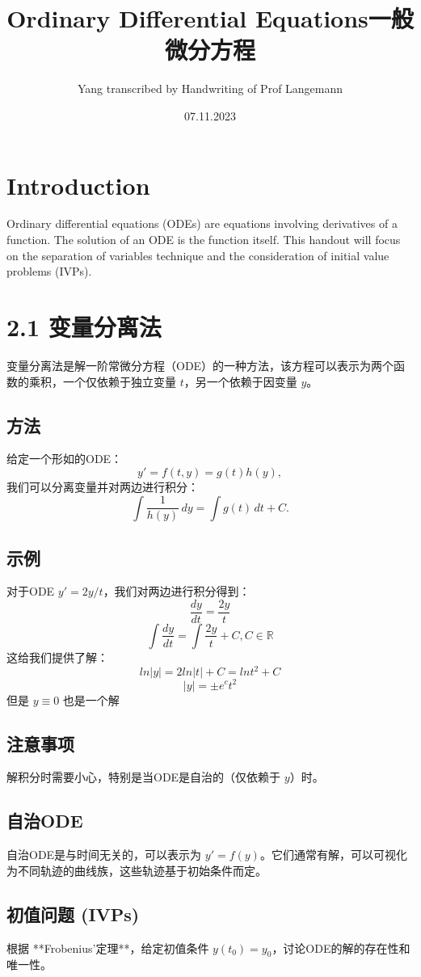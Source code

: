 \documentclass{ctexart}
\title{Ordinary Differential Equations一般微分方程}
\author{Yang transcribed by Handwriting of Prof Langemann}
\date{07.11.2023}
\begin{document}
\maketitle

\section*{Introduction}
Ordinary differential equations (ODEs) are equations involving derivatives of a function. The solution of an ODE is the function itself. This handout will focus on the separation of variables technique and the consideration of initial value problems (IVPs).

\section*{2.1 变量分离法}
变量分离法是解一阶常微分方程（ODE）的一种方法，该方程可以表示为两个函数的乘积，一个仅依赖于独立变量 \( t \)，另一个依赖于因变量 \( y \)。

\subsection*{方法}
给定一个形如的ODE：
\[ y' = f(t,y) = g(t)h(y), \]
我们可以分离变量并对两边进行积分：
\[ \int \frac{1}{h(y)} \, dy = \int g(t) \, dt + C. \]

\subsection*{示例}
对于ODE \( y' = 2y/t \)，我们对两边进行积分得到：
\[\frac{dy}{dt} = \frac{2y}{t}\]
\[ \int \frac{dy}{dt} = \int \frac{2y}{t} + C , C \in \mathbb{R}\]
这给我们提供了解：
\[ ln|y| = 2ln|t| + C = ln t^2 + C\]
\[|y| = \pm e^c t^2\]
但是 \(y \equiv 0\) 也是一个解

\subsection*{注意事项}
解积分时需要小心，特别是当ODE是自治的（仅依赖于 \( y \)）时。

\subsection*{自治ODE}
自治ODE是与时间无关的，可以表示为 \( y' = f(y) \)。它们通常有解，可以可视化为不同轨迹的曲线族，这些轨迹基于初始条件而定。

\subsection*{初值问题 (IVPs)}
根据 **Frobenius'定理**，给定初值条件 \( y(t_0) = y_0 \)，讨论ODE的解的存在性和唯一性。
\end{document}
